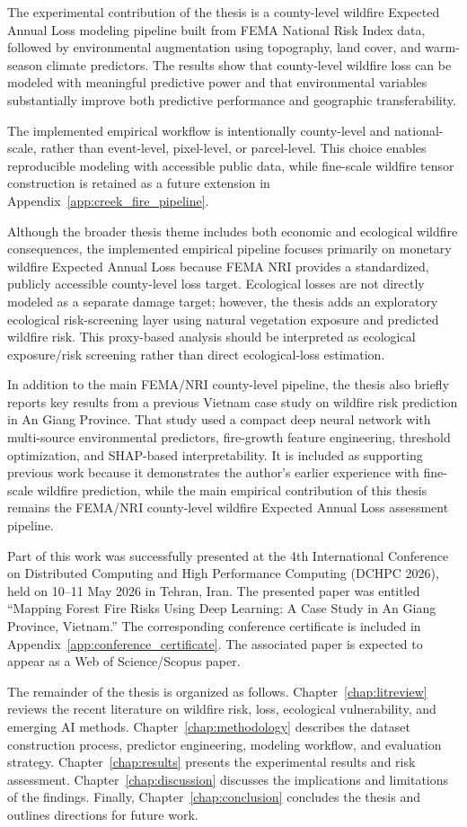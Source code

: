 The experimental contribution of the thesis is a county-level wildfire Expected Annual Loss modeling pipeline built from FEMA National Risk Index data, followed by environmental augmentation using topography, land cover, and warm-season climate predictors. The results show that county-level wildfire loss can be modeled with meaningful predictive power and that environmental variables substantially improve both predictive performance and geographic transferability.

The implemented empirical workflow is intentionally county-level and national-scale, rather than event-level, pixel-level, or parcel-level. This choice enables reproducible modeling with accessible public data, while fine-scale wildfire tensor construction is retained as a future extension in Appendix~\ref{app:creek_fire_pipeline}.

Although the broader thesis theme includes both economic and ecological wildfire consequences, the implemented empirical pipeline focuses primarily on monetary wildfire Expected Annual Loss because FEMA NRI provides a standardized, publicly accessible county-level loss target. Ecological losses are not directly modeled as a separate damage target; however, the thesis adds an exploratory ecological risk-screening layer using natural vegetation exposure and predicted wildfire risk. This proxy-based analysis should be interpreted as ecological exposure/risk screening rather than direct ecological-loss estimation.

In addition to the main FEMA/NRI county-level pipeline, the thesis also briefly reports key results from a previous Vietnam case study on wildfire risk prediction in An Giang Province. That study used a compact deep neural network with multi-source environmental predictors, fire-growth feature engineering, threshold optimization, and SHAP-based interpretability. It is included as supporting previous work because it demonstrates the author's earlier experience with fine-scale wildfire prediction, while the main empirical contribution of this thesis remains the FEMA/NRI county-level wildfire Expected Annual Loss assessment pipeline.

Part of this work was successfully presented at the 4th International Conference on Distributed Computing and High Performance Computing (DCHPC 2026), held on 10--11 May 2026 in Tehran, Iran. The presented paper was entitled ``Mapping Forest Fire Risks Using Deep Learning: A Case Study in An Giang Province, Vietnam.'' The corresponding conference certificate is included in Appendix~\ref{app:conference_certificate}. The associated paper is expected to appear as a Web of Science/Scopus paper.

The remainder of the thesis is organized as follows. Chapter~\ref{chap:litreview} reviews the recent literature on wildfire risk, loss, ecological vulnerability, and emerging AI methods. Chapter~\ref{chap:methodology} describes the dataset construction process, predictor engineering, modeling workflow, and evaluation strategy. Chapter~\ref{chap:results} presents the experimental results and risk assessment. Chapter~\ref{chap:discussion} discusses the implications and limitations of the findings. Finally, Chapter~\ref{chap:conclusion} concludes the thesis and outlines directions for future work.